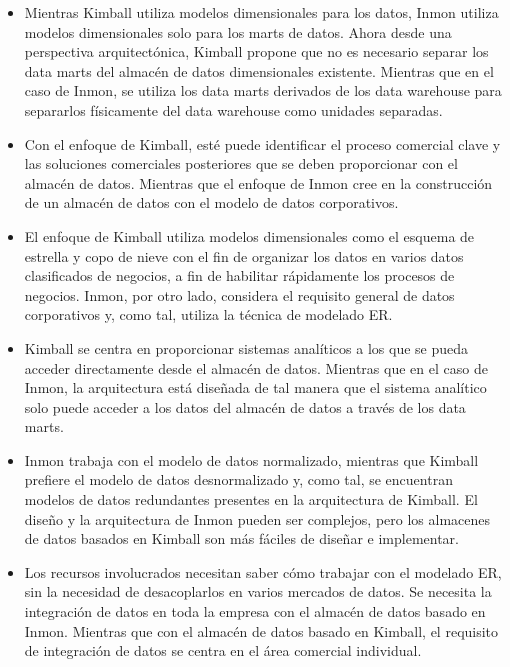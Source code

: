 \documentclass[%
 reprint,
 amsmath,amssymb,
 aps,
]{revtex4-1}
\begin{document}
\begin{itemize}
\item Mientras Kimball utiliza modelos dimensionales para los datos, Inmon utiliza modelos dimensionales solo para los marts de datos. Ahora desde una perspectiva arquitectónica, Kimball propone que no es necesario separar los data marts del almacén de datos dimensionales existente. Mientras que en el caso de Inmon, se utiliza los data marts derivados de los data warehouse para separarlos físicamente del data warehouse como unidades separadas.
\item Con el enfoque de Kimball, esté puede identificar el proceso comercial clave y las soluciones comerciales posteriores que se deben proporcionar con el almacén de datos. Mientras que el enfoque de Inmon cree en la construcción de un almacén de datos con el modelo de datos corporativos.
\item El enfoque de Kimball utiliza modelos dimensionales como el esquema de estrella y copo de nieve con el fin de organizar los datos en varios datos clasificados de negocios, a fin de habilitar rápidamente los procesos de negocios. Inmon, por otro lado, considera el requisito general de datos corporativos y, como tal, utiliza la técnica de modelado ER. 
\item Kimball se centra en proporcionar sistemas analíticos a los que se pueda acceder directamente desde el almacén de datos. Mientras que en el caso de Inmon, la arquitectura está diseñada de tal manera que el sistema analítico solo puede acceder a los datos del almacén de datos a través de los data marts.
\item Inmon trabaja con el modelo de datos normalizado, mientras que Kimball prefiere el modelo de datos desnormalizado y, como tal, se encuentran modelos de datos redundantes presentes en la arquitectura de Kimball. El diseño y la arquitectura de Inmon pueden ser complejos, pero los almacenes de datos basados en Kimball son más fáciles de diseñar e implementar.
\item Los recursos involucrados necesitan saber cómo trabajar con el modelado ER, sin la necesidad de desacoplarlos en varios mercados de datos. Se necesita la integración de datos en toda la empresa con el almacén de datos basado en Inmon. Mientras que con el almacén de datos basado en Kimball, el requisito de integración de datos se centra en el área comercial individual.\cite{torres}
\end{itemize}

\end{document}
